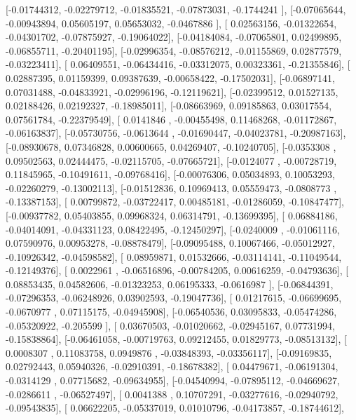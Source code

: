 \documentclass{article}
\begin{document}
       [-0.01744312, -0.02279712, -0.01835521, -0.07873031, -0.1744241 ],
       [-0.07065644, -0.00943894,  0.05605197,  0.05653032, -0.0467886 ],
       [ 0.02563156, -0.01322654, -0.04301702, -0.07875927, -0.19064022],
       [-0.04184084, -0.07065801,  0.02499895, -0.06855711, -0.20401195],
       [-0.02996354, -0.08576212, -0.01155869,  0.02877579, -0.03223411],
       [ 0.06409551, -0.06434416, -0.03312075,  0.00323361, -0.21355846],
       [ 0.02887395,  0.01159399,  0.09387639, -0.00658422, -0.17502031],
       [-0.06897141,  0.07031488, -0.04833921, -0.02996196, -0.12119621],
       [-0.02399512,  0.01527135,  0.02188426,  0.02192327, -0.18985011],
       [-0.08663969,  0.09185863,  0.03017554,  0.07561784, -0.22379549],
       [ 0.0141846 , -0.00455498,  0.11468268, -0.01172867, -0.06163837],
       [-0.05730756, -0.0613644 , -0.01690447, -0.04023781, -0.20987163],
       [-0.08930678,  0.07346828,  0.00600665,  0.04269407, -0.10240705],
       [-0.0353308 ,  0.09502563,  0.02444475, -0.02115705, -0.07665721],
       [-0.0124077 , -0.00728719,  0.11845965, -0.10491611, -0.09768416],
       [-0.00076306,  0.05034893,  0.10053293, -0.02260279, -0.13002113],
       [-0.01512836,  0.10969413,  0.05559473, -0.0808773 , -0.13387153],
       [ 0.00799872, -0.03722417,  0.00485181, -0.01286059, -0.10847477],
       [-0.00937782,  0.05403855,  0.09968324,  0.06314791, -0.13699395],
       [ 0.06884186, -0.04014091, -0.04331123,  0.08422495, -0.12450297],
       [-0.0240009 , -0.01061116,  0.07590976,  0.00953278, -0.08878479],
       [-0.09095488,  0.10067466, -0.05012927, -0.10926342, -0.04598582],
       [ 0.08959871,  0.01532666, -0.03114141, -0.11049544, -0.12149376],
       [ 0.0022961 , -0.06516896, -0.00784205,  0.00616259, -0.04793636],
       [ 0.08853435,  0.04582606, -0.01323253,  0.06195333, -0.0616987 ],
       [-0.06844391, -0.07296353, -0.06248926,  0.03902593, -0.19047736],
       [ 0.01217615, -0.06699695, -0.0670977 ,  0.07115175, -0.04945908],
       [-0.06540536,  0.03095833, -0.05474286, -0.05320922, -0.205599  ],
       [ 0.03670503, -0.01020662, -0.02945167,  0.07731994, -0.15838864],
       [-0.06461058, -0.00719763,  0.09212455,  0.01829773, -0.08513132],
       [ 0.0008307 ,  0.11083758,  0.0949876 , -0.03848393, -0.03356117],
       [-0.09169835,  0.02792443,  0.05940326, -0.02910391, -0.18678382],
       [ 0.04479671, -0.06191304, -0.0314129 ,  0.07715682, -0.09634955],
       [-0.04540994, -0.07895112, -0.04669627, -0.0286611 , -0.06527497],
       [ 0.0041388 ,  0.10707291, -0.03277616, -0.02940792, -0.09543835],
       [ 0.06622205, -0.05337019,  0.01010796, -0.04173857, -0.18744612],
\end{document}
